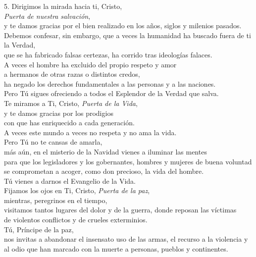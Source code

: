 5. Dirigimos la mirada hacia ti, Cristo,\emph{\\ Puerta de nuestra salvación},\\ y te damos gracias por el bien realizado en los años, siglos y milenios pasados.\\ Debemos confesar, sin embargo, que a veces la humanidad ha buscado fuera de ti la Verdad,\\ que se ha fabricado falsas certezas, ha corrido tras ideologías falaces.\\ A veces el hombre ha excluido del propio respeto y amor\\ a hermanos de otras razas o distintos credos,\\ ha negado los derechos fundamentales a las personas y a las naciones.\\ Pero Tú sigues ofreciendo a todos el Esplendor de la Verdad que salva.\\ Te miramos a Ti, Cristo, \emph{Puerta de la Vida},\\ y te damos gracias por los prodigios\\ con que has enriquecido a cada generación.\\ A veces este mundo a veces no respeta y no ama la vida.\\ Pero Tú no te cansas de amarla,\\ más aún, en el misterio de la Navidad vienes a iluminar las mentes\\ para que los legisladores y los gobernantes, hombres y mujeres de buena voluntad se comprometan a acoger, como don precioso, la vida del hombre.\\ Tú vienes a darnos el Evangelio de la Vida.\\ Fijamos los ojos en Ti, Cristo, \emph{Puerta de la paz},\\ mientras, peregrinos en el tiempo,\\ visitamos tantos lugares del dolor y de la guerra, donde reposan las víctimas\\ de violentos conflictos y de crueles exterminios.\\ Tú, Príncipe de la paz,\\ nos invitas a abandonar el insensato uso de las armas, el recurso a la violencia y al odio que han marcado con la muerte a personas, pueblos y continentes.

